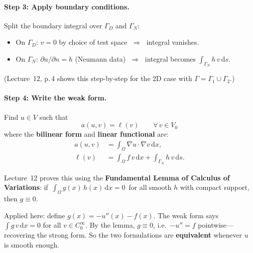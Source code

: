 \documentclass[11pt,a4paper]{article}
\theoremstyle{plain}
\theoremstyle{remark}
\newcommand{\dx}{\,\mathrm{d}x}
\newcommand{\ds}{\,\mathrm{d}s}
\let\origparagraph\paragraph
\renewcommand{\paragraph}[1]{\needspace{4\baselineskip}\origparagraph{#1}}
\begin{document}
\paragraph{Step 3: Apply boundary conditions.}
Split the boundary integral over $\Gamma_D$ and $\Gamma_N$:
\begin{itemize}[nosep]
  \item On $\Gamma_D$: $v = 0$ by choice of test space
        $\;\Rightarrow\;$ integral vanishes.
  \item On $\Gamma_N$: $\partial u/\partial n = h$ (Neumann data)
        $\;\Rightarrow\;$ integral becomes
        $\displaystyle\int_{\Gamma_N} h\,v\ds$.
\end{itemize}
(Lecture~12, p.\,4 shows this step-by-step for the 2D case with
$\Gamma = \Gamma_1 \cup \Gamma_2$.)

\paragraph{Step 4: Write the weak form.}

\begin{definition}
Find $u \in V$ such that
\begin{equation}
  \boxed{\;a(u,v) = \ell(v) \qquad \forall\, v \in V_0\;}
  \label{eq:weak}
\end{equation}
where the \textbf{bilinear form} and \textbf{linear functional} are:
\begin{align}
  a(u,v)  &= \int_\Omega \nabla u \cdot \nabla v \dx,
             \label{eq:bilinear}\\[4pt]
  \ell(v) &= \int_\Omega f\, v \dx
             + \int_{\Gamma_N} h\, v \ds.
             \label{eq:linear}
\end{align}
\end{definition}

\begin{intuition}[Why does weak\,$=$\,strong?]
Lecture~12 proves this using the \textbf{Fundamental Lemma of Calculus of
Variations}: if\, $\int_\Omega g(x)\,h(x)\dx = 0$\, for all smooth $h$
with compact support, then $g \equiv 0$.

Applied here: define $g(x) = -u''(x) - f(x)$.  The weak form says
$\int g\,v\dx = 0$ for all $v \in C_0^\infty$.  By the lemma,
$g \equiv 0$, i.e.\ $-u'' = f$ pointwise---recovering the strong form.
So the two formulations are \textbf{equivalent} whenever $u$ is smooth
enough.
\end{intuition}
\end{document}
